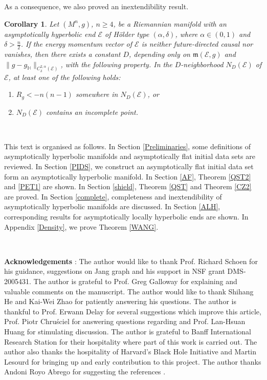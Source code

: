 \documentclass[11pt]{amsart}
\newtheorem{cor}{Corollary}[section]
\theoremstyle{remark}
\numberwithin{equation}{section}
\def\a{{\alpha}}
\def\d{\frac {\operatorname d}{\operatorname {dt}}}
\def\d{\delta}
\def\m{\mathfrak{m}}
\def\mE{\mathcal{E}}
\def\mE{\mathcal{E}}
\def\HH{\mathbb{H}}
\def\gH{g_{\HH}}
\begin{document}
{{As a consequence, we also proved an inextendibility result. 
\begin{cor}\label{CZ}
Let $(M^n,g)$,  $n\ge 4$, be a Riemannian manifold with an asymptotically hyperbolic end $\mathcal E$ of H\"older type $(\a,\d)$, where $\a\in(0,1)$ and $\delta>\frac{n}{2}$. 
 If the energy momentum vector of $\mathcal E$ is neither future-directed causal nor vanishes, then there exists a constant $D$, depending only on $\m(\mE,g)$ and $\|g-\gH\|_{C^{2,\a}_{\d}(\mathcal E)}$, with the following property. In the $D$-neighborhood $N_D(\mathcal E)$ of $\mathcal E$, at least one of the following holds:
\begin{enumerate}
 \item $R_g<-n(n-1)$ somewhere in $N_D(\mathcal E)$, or

 \item $N_D(\mathcal E)$ contains an incomplete point. 
\end{enumerate}
\end{cor}

\

This text is organised as follows. In Section \ref{Preliminaries}, some definitions of asymptotically hyperbolic manifolds and asymptotically flat initial data sets are reviewed.  In Section \ref{PIDS}, we construct an asymptotically flat initial data set form an asymptotically hyperbolic manifold. In Section \ref{AF},  Theorem \ref{QST2} and \ref{PET1} are shown. In Section \ref{shield}, Theorem \ref{QST} and Theorem \ref{CZ2} are proved. In Section \ref{complete}, completeness and inextendibility of asymptotically hyperbolic manifolds are discussed. In Section \ref{ALH}, corresponding results for asymptotically locally hyperbolic ends are shown.  In Appendix \ref{Density}, we prove Theorem \ref{WANG}.  %

\

\textbf{Acknowledgements }: 
The author would like to thank Prof. Richard Schoen for his guidance, suggestions on Jang graph and his support in NSF grant DMS-2005431. The author is grateful to Prof. Greg Galloway for explaining \cite{ACG} and valuable comments on the manuscript.  The author would like to thank Shihang He and Kai-Wei Zhao for patiently answering his questions. The author is thankful to Prof. Erwann Delay for several suggestions which improve this article, Prof. Piotr Chruściel for answering questions regarding \cite{CGNP18} and Prof. Lan-Hsuan Huang for stimulating discussion.  The author is grateful to Banff International Research Station for their hospitality where part of this work is carried out. The author also thanks the hospitality of Harvard’s Black Hole Initiative and Martin Lesourd for bringing up and early contribution to this project. The author thanks Andoni Royo Abrego for suggesting the references \cite{G, DGS}.  


}}
\end{document}
